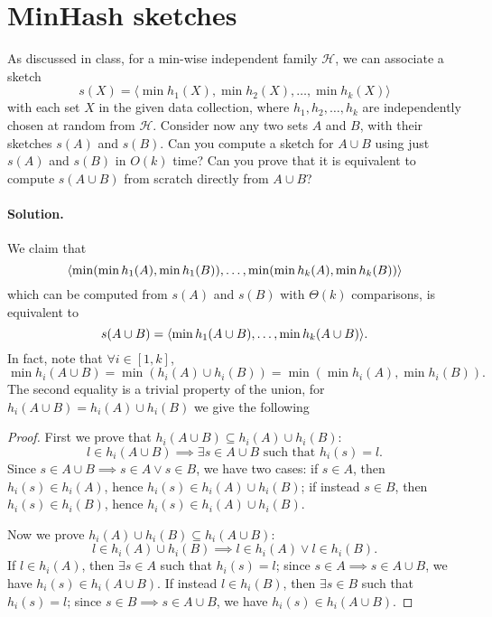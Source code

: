 \section{MinHash sketches}

As discussed in class, for a min-wise independent family $\mathcal{H}$, we can associate a sketch $$s(X) = \langle \min h_1(X), \min h_2(X), \dots , \min h_k(X) \rangle$$ with each set $X$ in the given data collection, where $h_1, h_2, \dots , h_k$ are independently chosen at random from $\mathcal{H}$. Consider now any two sets $A$ and $B$, with their sketches $s(A)$ and $s(B)$. Can you compute a sketch for $A \cup B$ using just $s(A)$ and $s(B)$ in $O(k)$ time? Can you prove that it is equivalent to compute $s(A \cup B)$ from scratch directly from $A \cup B$?

\vspace{0.5cm}
\paragraph{Solution.}  We claim that
$$\langle\min(\min h_1(A), \min h_1(B)), \dots, \min(\min h_k(A), \min h_k(B))\rangle$$
which can be computed from $s(A)$ and $s(B)$ with $\Theta(k)$ comparisons, is equivalent to
$$s(A \cup B) = \langle\min h_1(A \cup B), \dots , \min h_k(A \cup B)\rangle.$$
In fact, note that $\forall i \in [1, k]$, $$\min h_i(A \cup B) = \min (h_i(A) \cup h_i(B)) = \min ( \min h_i(A), \min h_i(B)).$$
The second equality is a trivial property of the union, for $h_i(A \cup B) = h_i(A) \cup h_i(B)$ we give the following
\begin{proof}
  First we prove that $h_i(A \cup B) \subseteq h_i(A) \cup h_i(B)$:
  $$l \in h_i(A \cup B) \implies \exists s \in A \cup B \text{ such that } h_i(s) = l.$$
 Since $s \in A \cup B \implies s \in A \vee s \in B$, we have two cases: if $s\in A$, then $h_i(s) \in h_i(A)$, hence $ h_i(s) \in h_i(A)\cup h_i(B)$; if instead $s\in B$, then $h_i(s) \in h_i(B) $, hence $ h_i(s) \in h_i(A)\cup h_i(B)$.

  Now we prove $h_i(A) \cup h_i(B) \subseteq h_i(A \cup B)$:
  $$l \in h_i(A) \cup h_i(B) \implies l \in h_i(A) \vee l \in h_i(B).$$
  If $l \in h_i(A)$, then $\exists s \in A$ such that $h_i(s)=l$; since $s \in A \implies s \in A \cup B$, we have $h_i(s) \in h_i(A \cup B)$. If instead $l \in h_i(B)$, then $\exists s \in B$ such that $h_i(s)=l$; since $s \in B \implies s \in A \cup B$, we have $h_i(s) \in h_i(A \cup B)$.
\end{proof}